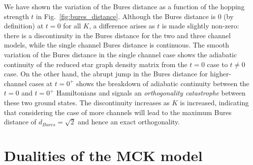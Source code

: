 \documentclass[reprint,prb,superscriptaddress]{revtex4-2}
\begin{document}
We have shown the variation of the Bures distance as a function of the hopping strength \(t\) in Fig.~\ref{fig:bures_distance}. Although the Bures distance is \(0\) (by definition) at \(t=0\) for all \(K\), a difference arises as \(t\) is made slightly non-zero: there is a discontinuity in the Bures distance for the two and three channel models, while the single channel Bures distance is continuous. The smooth variation of the Bures distance in the single channel case shows the adiabatic continuity of the reduced star graph density matrix from the $t=0$ case to $t\neq 0$ case. On the other hand, the abrupt jump in the Bures distance for higher-channel cases at $t=0^+$ shows the breakdown of adiabatic continuity between the \(t=0\) and \(t = 0^+\) Hamiltonians and signals an {\it orthogonality catastrophe} between these two ground states. The discontinuity increases as \(K\) is increased, indicating that considering the case of more channels will lead to the maximum Bures distance of $d_{Bures}=\sqrt{2}$ and hence an exact orthogonality.

\section{Dualities of the MCK model}
\label{sec:duality}
\end{document}
